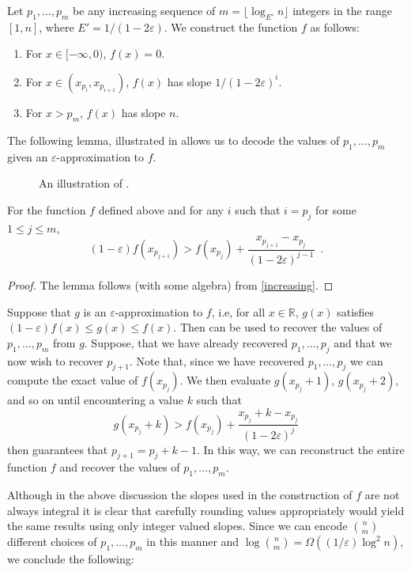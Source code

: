 \documentclass[charterfonts,lotsofwhite]{patmorin}
\newcommand{\eps}{\varepsilon}
\newcommand{\Real}{\mathbb{R}}
\newcommand{\dlt}{2\eps}
\begin{document}
Let $p_1,\ldots,p_m$ be any increasing sequence of $m=\lfloor\log_{E'}
n\rfloor$ integers in the range $[1,n]$, where $E'=1/(1-2\eps)$.  We
construct the function $f$ as follows:
\begin{enumerate}
\item For $x\in [-\infty,0)$, $f(x)=0$.
\item For $x\in (x_{p_i},x_{p_{i+1}})$, $f(x)$ has slope $1/(1-\dlt)^i$.
\item For $x>p_m$, $f(x)$ has slope $n$.
\end{enumerate}

The following lemma, illustrated in  allows us to
decode the values of $p_1,\ldots,p_m$ given an
$\eps$-approximation to $f$.

\begin{figure}
\caption{An illustration of .}
\end{figure}

\begin{lem}
  For the function $f$ defined above and for any $i$ such that $i=p_j$
  for some $1\le j\le m$, 
  \[  (1-\eps)f(x_{p_{j+1}}) > f(x_{p_j}) + \frac{x_{p_{j+1}}-x_{p_j}}{(1-\dlt)^{j-1}} 
  \enspace .\]
\end{lem}

\begin{proof}
  The lemma follows (with some algebra) from \eqref{increasing}.
\end{proof}

Suppose that $g$ is an $\eps$-approximation to $f$, i.e, for all
$x\in\Real$, $g(x)$ satisfies $(1-\eps)f(x)\le g(x)\le f(x)$.  Then
 can be used to recover the values of
$p_1,\ldots,p_m$ from $g$.  Suppose, that we have already recovered
$p_1,\ldots,p_{j}$ and that we now wish to recover $p_{j+1}$.  Note
that, since we have recovered $p_1,\ldots,p_{j}$ we can compute the
exact value of $f(x_{p_j})$.  We then evaluate $g(x_{p_j}+1)$,
$g(x_{p_j}+2)$, and so on until encountering a value $k$ such that
\[
   g(x_{p_j}+k)>f(x_{p_j})+\frac{x_{p_j}+k-x_{p_j}}{(1-\dlt)^j}
\]
 then guarantees that $p_{j+1}=p_{j}+k-1$.  In this
way, we can reconstruct the entire function $f$ and recover the values
of $p_1,\ldots,p_m$.

Although in the above discussion the slopes used in the construction
of $f$ are not always integral it is clear that carefully rounding
values appropriately would yield the same results using only integer
valued slopes.  Since we can encode $n\choose m$ different choices of
$p_1,\ldots,p_m$ in this manner and 
$\log {{n}\choose{m}} =\Omega((1/\eps)\log^2n)$, 
we conclude the following:
\end{document}
